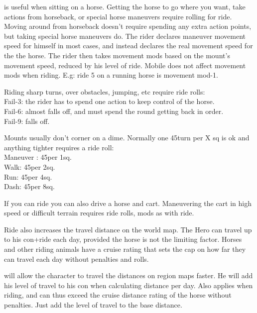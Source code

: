  is useful when sitting on a horse. Getting the horse to go where you want, take actions from horseback, or special horse maneuvers require rolling for ride. Moving around from horseback doesn't require spending any extra action points, but taking special horse maneuvers do. The rider declares maneuver movement speed for himself in most cases, and instead declares the real movement speed for the the horse. The rider then takes movement mods based on the mount's movement speed, reduced by his level of ride. Mobile does not affect movement mods when riding. E.g: ride 5 on a running horse is movement mod-1.

Riding sharp turns, over obstacles, jumping, etc require ride rolls:\\
Fail-3: the rider has to spend one action to keep control of the horse.\\
Fail-6: almost falls off, and must spend the round getting back in order.\\
Fail-9: falls off.

Mounts usually don't corner on a dime. Normally one 45\degrees turn per X sq is ok and anything tighter requires a ride roll:\\
Maneuver : 45\degrees per 1sq.\\
Walk: 45\degrees per 2sq.\\
Run: 45\degrees per 4sq.\\
Dash: 45\degrees per 8sq.


If you can ride you can also drive a horse and cart. Maneuvering the cart in high speed or difficult terrain requires ride rolls, mods as with ride.

Ride also increases the travel distance on the world map. The Hero can travel up to his con+ride each day, provided the horse is not the limiting factor. Horses and other riding animals have a cruise rating that sets the cap on how far they can travel each day without penalties and rolls.


 will allow the character to travel the distances on region maps faster. He will add his level of travel to his con when calculating distance per day. Also applies when riding, and can thus exceed the cruise distance rating of the horse without penalties. Just add the level of travel to the base distance.


